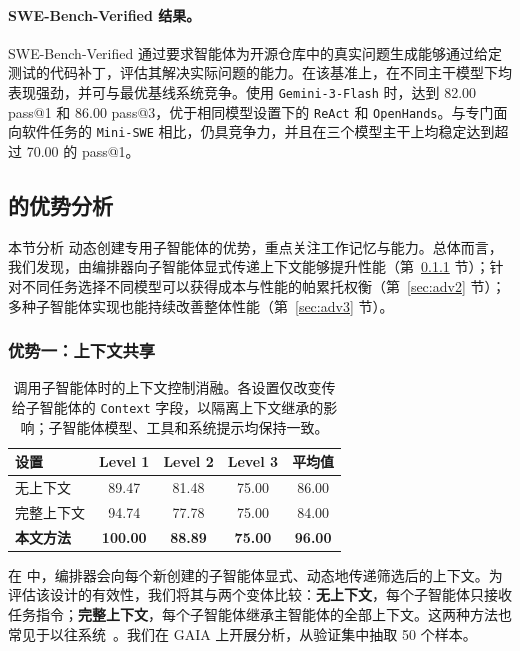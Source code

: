 \paragraph{SWE-Bench-Verified 结果。}
SWE-Bench-Verified 通过要求智能体为开源仓库中的真实问题生成能够通过给定测试的代码补丁，评估其解决实际问题的能力。在该基准上，\our 在不同主干模型下均表现强劲，并可与最优基线系统竞争。使用 \texttt{Gemini-3-Flash} 时，\our 达到 82.00 pass@1 和 86.00 pass@3，优于相同模型设置下的 \texttt{ReAct} 和 \texttt{OpenHands}。与专门面向软件任务的 \texttt{Mini-SWE} 相比，\our 仍具竞争力，并且在三个模型主干上均稳定达到超过 70.00 的 pass@1。

\subsection{\our 的优势分析}
\label{subsec:adv}
本节分析 \our 动态创建专用子智能体的优势，重点关注工作记忆与能力。总体而言，我们发现，由编排器向子智能体显式传递上下文能够提升性能（第~\ref{sec:adv1} 节）；针对不同任务选择不同模型可以获得成本与性能的帕累托权衡（第~\ref{sec:adv2} 节）；多种子智能体实现也能持续改善整体性能（第~\ref{sec:adv3} 节）。

\subsubsection{优势一：上下文共享}
\label{sec:adv1}

\begin{table}[t]
\centering
\small
\setlength{\tabcolsep}{6pt}
\renewcommand{\arraystretch}{1.15}
\caption{调用子智能体时的上下文控制消融。各设置仅改变传给子智能体的 \texttt{Context} 字段，以隔离上下文继承的影响；子智能体模型、工具和系统提示均保持一致。}
\label{tab:context_control}
\begin{tabular}{l c c c c}
\toprule
\textbf{设置} & \textbf{Level 1} & \textbf{Level 2} & \textbf{Level 3} & \textbf{平均值} \\
\midrule
无上下文    & 89.47 & 81.48 & 75.00 & 86.00 \\
完整上下文  & 94.74 & 77.78 & 75.00 & 84.00 \\
\textbf{本文方法} & \textbf{100.00} & \textbf{88.89} & \textbf{75.00} & \textbf{96.00} \\
\bottomrule
\end{tabular}
\end{table}

在 \our{} 中，编排器会向每个新创建的子智能体显式、动态地传递筛选后的上下文。为评估该设计的有效性，我们将其与两个变体比较：\textbf{无上下文}，每个子智能体只接收任务指令；\textbf{完整上下文}，每个子智能体继承主智能体的全部上下文。这两种方法也常见于以往系统~\cite{sun2025scaling, anthropic_claude_code_subagents}。我们在 GAIA 上开展分析，从验证集中抽取 50 个样本。


